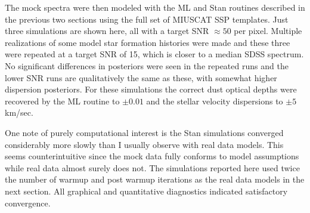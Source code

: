 \documentclass[modern]{aastex62}
\begin{document}
The mock spectra were then modeled with the ML and Stan routines described in the previous two sections using the full set of MIUSCAT SSP templates. Just three simulations are shown here, all with a target SNR $\approx 50$ per pixel. Multiple realizations of some model star formation histories were made and these three were repeated at a target SNR of 15, which is closer to a median SDSS spectrum. No significant differences in posteriors were seen in the repeated runs and the lower SNR runs are qualitatively the same as these, with somewhat higher dispersion posteriors. For these simulations the correct dust optical depths were recovered by the ML routine to $\pm 0.01$ and the stellar velocity dispersions to $\pm 5$ km/sec.

One note of purely computational interest is the Stan simulations converged considerably more slowly than I usually observe with real data models. This seems counterintuitive since the mock data fully conforms to model assumptions while real data almost surely does not. The simulations reported here used twice the number of warmup and post warmup iterations as the real data models in the next section. All graphical and quantitative diagnostics indicated satisfactory convergence.
\end{document}
